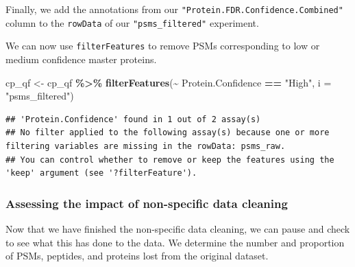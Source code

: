\documentclass[9pt,a4paper,]{extarticle}
\newenvironment{Shaded}{\begin{snugshade}}{\end{snugshade}}
\newcommand{\AttributeTok}[1]{\textcolor[rgb]{0.13,0.29,0.53}{#1}}
\newcommand{\FunctionTok}[1]{\textcolor[rgb]{0.13,0.29,0.53}{\textbf{#1}}}
\newcommand{\NormalTok}[1]{#1}
\newcommand{\OtherTok}[1]{\textcolor[rgb]{0.56,0.35,0.01}{#1}}
\newcommand{\SpecialCharTok}[1]{\textcolor[rgb]{0.81,0.36,0.00}{\textbf{#1}}}
\newcommand{\StringTok}[1]{\textcolor[rgb]{0.31,0.60,0.02}{#1}}
\begin{document}
Finally, we add the annotations from our \texttt{"Protein.FDR.Confidence.Combined"}
column to the \texttt{rowData} of our \texttt{"psms\_filtered"} experiment.

\begin{Shaded}
\end{Shaded}

We can now use \texttt{filterFeatures} to remove PSMs corresponding to low or medium
confidence master proteins.

\begin{Shaded}
\begin{Highlighting}[]
\NormalTok{cp\_qf }\OtherTok{\textless{}{-}}\NormalTok{ cp\_qf }\SpecialCharTok{\%\textgreater{}\%}
  \FunctionTok{filterFeatures}\NormalTok{(}\SpecialCharTok{\textasciitilde{}}\NormalTok{ Protein.Confidence }\SpecialCharTok{==} \StringTok{"High"}\NormalTok{, }\AttributeTok{i =} \StringTok{"psms\_filtered"}\NormalTok{)}
\end{Highlighting}
\end{Shaded}

\begin{verbatim}
## 'Protein.Confidence' found in 1 out of 2 assay(s)
## No filter applied to the following assay(s) because one or more filtering variables are missing in the rowData: psms_raw.
## You can control whether to remove or keep the features using the 'keep' argument (see '?filterFeature').
\end{verbatim}

\subsubsection{Assessing the impact of non-specific data cleaning}\label{assessing-the-impact-of-non-specific-data-cleaning}

Now that we have finished the non-specific data cleaning, we can pause and check
to see what this has done to the data. We determine the number and proportion of
PSMs, peptides, and proteins lost from the original dataset.
\end{document}
